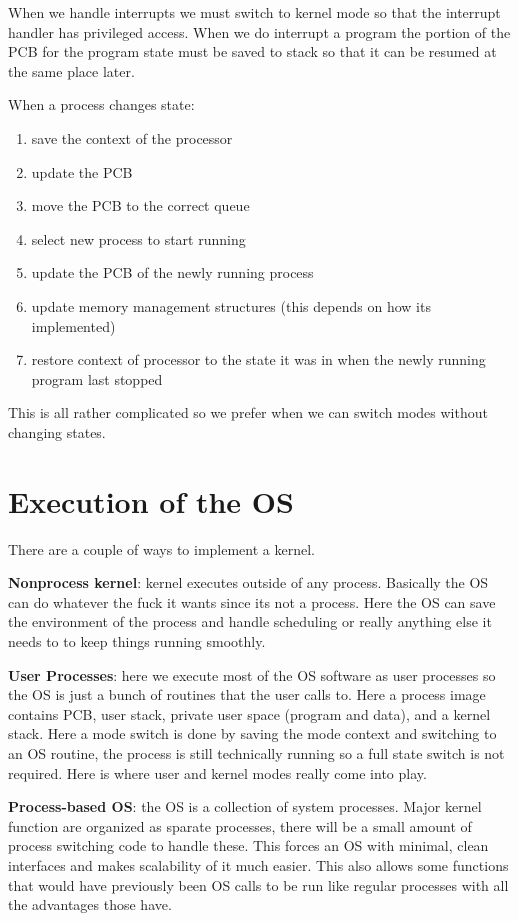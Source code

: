 \documentclass[12pt]{article}
\begin{document}
When we handle interrupts we must switch to kernel mode so that the interrupt handler has privileged access. When we do interrupt a program the portion of the PCB for the program state must be saved to stack so that it can be resumed at the same place later.

When a process changes state:
\begin{enumerate}
    \item save the context of the processor
    \item update the PCB
    \item move the PCB to the correct queue
    \item select new process to start running
    \item update the PCB of the newly running process
    \item update memory management structures (this depends on how its implemented)
    \item restore context of processor to the state it was in when the newly running program last stopped
\end{enumerate}

This is all rather complicated so we prefer when we can switch modes without changing states.

\section{Execution of the OS}
There are a couple of ways to implement a kernel.

\textbf{Nonprocess kernel}: kernel executes outside of any process. Basically the OS can do whatever the fuck it wants since its not a process. Here the OS can save the environment of the process and handle scheduling or really anything else it needs to to keep things running smoothly.

\textbf{User Processes}: here we execute most of the OS software as user processes so the OS is just a bunch of routines that the user calls to. Here a process image contains PCB, user stack, private user space (program and data), and a kernel stack. Here a mode switch is done by saving the mode context and switching to an OS routine, the process is still technically running so a full state switch is not required. Here is where user and kernel modes really come into play.

\textbf{Process-based OS}: the OS is a collection of system processes. Major kernel function are organized as sparate processes, there will be a small amount of process switching code to handle these. This forces an OS with minimal, clean interfaces and makes scalability of it much easier. This also allows some functions that would have previously been OS calls to be run like regular processes with all the advantages those have.
\end{document}
